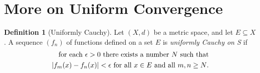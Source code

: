 \documentclass[12pt, lettersize]{book}
\theoremstyle{plain}
\newtheorem{thm}{Theorem}[section]
\theoremstyle{definition}
\newtheorem{dfn}[thm]{Definition}
\theoremstyle{remark}
\begin{document}
		\section{More on Uniform Convergence}
		\begin{comment}
		Here are two important facts about integration
		\begin{enumerate}
		\item If $g$ and $h$ are integrable on $[a,b]$ and if $g(x)\leq h(x)$ for all $x\in[a,b]$, then $\int_{a}^{b}g(x)dx\leq\int_{a}^{b}h(x)dx$.
		\item If $g$ is integrable on $[a,b]$, then
		\begin{displaymath}
		\abs{\int_{a}^{b}g(x)dx}\leq\int_{a}^{b}\abs{g(x)}dx.
		\end{displaymath}
		\end{enumerate}
		Also continuous functions on closed intervals are integrable.
		
		\begin{thm}\label{thm:25.2}
		Let $(f_n)$ be a sequence of continuous functions on $[a,b]$, and suppose $f_n\rightarrow f$ uniformly on $[a,b]$. Then
		\begin{displaymath}
		\lim\limits_{n\rightarrow\infty}\int_{a}^{b}f_n(x)dx=\int_{a}^{b}f(x)dx.
		\end{displaymath}
		\begin{proof}
		By \ref{def:24.3} $f$is continuous, so $f_n-f$ are all integrable on $[a,b]$. Let $\epsilon>0$. Since $f_n\rightarrow f$ uniformly on $[a,b]$, there exists $N$ such that $\abs{f_n(x)-f(x)}<\frac{\epsilon}{b-a}$ for all $x\in[a,b]$ and all $n>N$. Consequently $n>N$ implies
		\begin{align*}
		\abs{\int_{a}^{b}f_n(x)dx-\int_{a}^{b}f(x)dx}&=\abs{\int_{a}^{b}[f_n(x)-f(x)]dx}\\
		&\leq\int_{a}^{b}\abs{f_n(x)-f(x)}dx\\
		&\leq\int_{a}^{b}\frac{\epsilon}{b-a}dx\\
		&=\epsilon
		\end{align*}
		Thus $\lim\limits_{n\rightarrow\infty}\int_{a}^{b}f_n(x)dx=\int_{a}^{b}f(x)dx$.
		\end{proof}
		\end{thm}
		\end{comment}
		
		\begin{dfn}[Uniformly Cauchy]
			Let $(X,d)$ be a metric space, and let $E\subseteq X$. A sequence $(f_n)$ of functions defined on a set $E$ is \emph{uniformly Cauchy on S} if
			\begin{align*}
				\text{for each $\epsilon>0$ there exists a number $N$ such that}\\
				\text{$\abs{f_m(x)-f_n(x)}<\epsilon$ for all $x\in E$ and all $m,n\geq N$.}
			\end{align*}
		\end{dfn}
		
\end{document}
